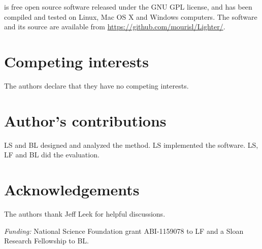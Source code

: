 \documentclass{bmcart}
\begin{document}
\tool is free open source software released under the GNU GPL license, and has been compiled and tested on Linux, Mac OS X and Windows computers.  The software and its source are available from \url{https://github.com/mourisl/Lighter/}.


\begin{backmatter}

\section*{Competing interests}
  The authors declare that they have no competing interests.

\section*{Author's contributions}
  LS and BL designed and analyzed the method. LS implemented the software. LS, LF and BL did the evaluation.

\section*{Acknowledgements}
The authors thank Jeff Leek for helpful discussions.

\noindent\emph{Funding:} National Science Foundation grant ABI-1159078 to LF and a Sloan Research Fellowship to BL.




\end{backmatter}
\end{document}
